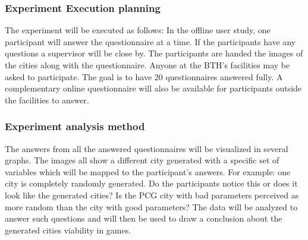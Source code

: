 		\subsubsection{Experiment Execution planning}
		The experiment will be executed as follows:
		In the offline user study, one participant will answer the questionnaire at a time. If the participants have any questions a supervisor will be close by. The participants are handed the images of the cities along with the questionnaire. Anyone at the BTH’s facilities may be asked to participate. The goal is to have 20 questionnaires answered fully. A complementary online questionnaire will also be available for participants outside the facilities to answer.
		
		\subsubsection{Experiment analysis method}
		The answers from all the answered questionnaires will be visualized in several graphs. The images all show a different city generated with a specific set of variables which will be mapped to the participant’s answers. For example: one city is completely randomly generated. Do the participants notice this or does it look like the generated cities? Is the PCG city with bad parameters perceived as more random than the city with good parameters?
		The data will be analyzed to answer such questions and will then be used to draw a conclusion about the generated cities viability in games.
	
	
	
	